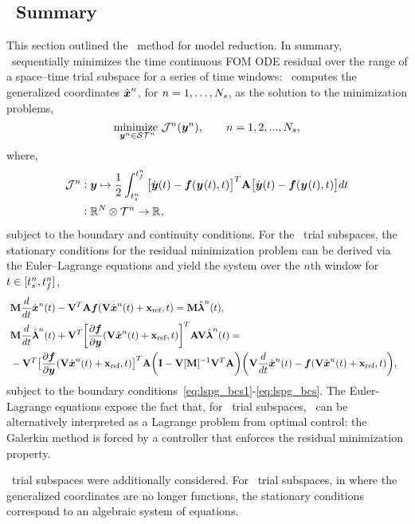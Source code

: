 



\subsection{\methodAcronym\ Summary}
This section outlined the \methodAcronym\ method for model reduction. In summary, \methodAcronym\ sequentially minimizes the time continuous FOM ODE residual over the range of a space--time trial subspace for a series of time windows: \methodAcronym\  
computes the generalized coordinates $\genstateArgnt{n}$, for $n = 1,\ldots,\nslabs$, as the solution to the minimization problems,
\begin{equation*}
\underset{\stateyArgnt{n} \in \stspace^n}{\text{minimize } }
\mathcal{J}^n(\stateyArgnt{n}), \qquad n = 1,2,...,\nslabs,
\end{equation*}
where,
\begin{align*}
\mathcal{J}^n &\vcentcolon \statey \mapsto
\frac{1}{2} \int_{\timeStartArg{n}}^{\timeEndArg{n}} \big[ \dot{\statey}(t)
- \velocity(\stateyArg{}{t},t) \big]^T \stweightingMatArg{n} \big[
\dot{\statey}(t) - \velocity(\stateyArg{}{t},t) \big] d t \\
&\vcentcolon \RR{\fomdim}\otimes \timeSpaceArg{n} \rightarrow
\RR{},
\end{align*}
subject to the boundary and continuity conditions. For the \spatialAcronym\ trial subspaces, the stationary conditions for the residual minimization problem can be derived via the Euler--Lagrange equations and yield the system over the $n$th window for $t \in [\timeStartArg{n},\timeEndArg{n}]$,
\begin{align*}\
&\mass \frac{d}{dt} \genstateArg{n}{t}  -  \basisspace^T
\stweightingMatArgt{n}{t} \velocity(\veloargsromn) =  \mass \adjointArg{n}{t} , \\
 &\mass \frac{d}{dt} \adjointArg{n}{t}  + \basisspace^T \bigg[\frac{\partial
\velocity}{\partial \statey} (\veloargsromn) \bigg]^T \stweightingMatArgt{n}{t} \basisspace
 \adjointArg{n}{t} = \nonumber \\ 
&-\basisspace^T \big[
\frac{\partial \velocity}{\partial \statey}(\veloargsromn) \big]^T \stweightingMatArgt{n}{t} \bigg( \mathbf{I} -
\basisspace [\massArgt{n}{t}]^{-1} \basisspace^T \stweightingMatArgt{n}{t} \bigg)
 \bigg( \basisspace \frac{d}{dt}\genstateArg{n}{t}  -
\velocity(\veloargsromn) \bigg),  &
\end{align*} 
subject to the boundary conditions~\eqref{eq:lspg_bcs1}-\eqref{eq:lspg_bcs}. The Euler-Lagrange equations expose the fact that, for \spatialAcronym\
trial subspaces, \methodAcronym\ can be alternatively interpreted as a Lagrange problem from optimal control: the Galerkin method is forced by a 
controller that enforces the residual minimization property. 

\spaceTimeAcronym\ trial subspaces were additionally considered. For \spaceTimeAcronym\ trial subspaces, in where the generalized coordinates are no longer functions, the stationary conditions correspond to an algebraic system of equations.
